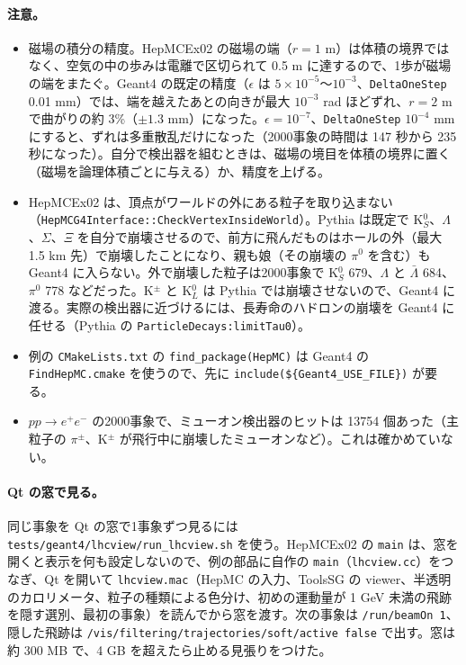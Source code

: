 \documentclass[a4paper,10pt]{ltjsarticle}
\begin{document}
\paragraph{注意。}
\begin{itemize}
\item 磁場の積分の精度。HepMCEx02 の磁場の端（$r=1$ m）は体積の境界ではなく、空気の中の歩みは電離で区切られて 0.5 m に達するので、1歩が磁場の端をまたぐ。Geant4 の既定の精度（$\epsilon$ は $5\times10^{-5}$〜$10^{-3}$、\texttt{DeltaOneStep} 0.01 mm）では、端を越えたあとの向きが最大 $10^{-3}$ rad ほどずれ、$r=2$ m で曲がりの約 3\%（$\pm1.3$ mm）になった。$\epsilon=10^{-7}$、\texttt{DeltaOneStep} $10^{-4}$ mm にすると、ずれは多重散乱だけになった（2000事象の時間は 147 秒から 235 秒になった）。自分で検出器を組むときは、磁場の境目を体積の境界に置く（磁場を論理体積ごとに与える）か、精度を上げる。
\item HepMCEx02 は、頂点がワールドの外にある粒子を取り込まない（\nolinkurl{HepMCG4Interface::CheckVertexInsideWorld}）。Pythia は既定で K$^0_S$、$\Lambda$、$\Sigma$、$\Xi$ を自分で崩壊させるので、前方に飛んだものはホールの外（最大 1.5 km 先）で崩壊したことになり、親も娘（その崩壊の $\pi^0$ を含む）も Geant4 に入らない。外で崩壊した粒子は2000事象で K$^0_S$ 679、$\Lambda$ と $\bar\Lambda$ 684、$\pi^0$ 778 などだった。K$^\pm$ と K$^0_L$ は Pythia では崩壊させないので、Geant4 に渡る。実際の検出器に近づけるには、長寿命のハドロンの崩壊を Geant4 に任せる（Pythia の \texttt{ParticleDecays:limitTau0}）。
\item 例の \texttt{CMakeLists.txt} の \texttt{find\_package(HepMC)} は Geant4 の \texttt{FindHepMC.cmake} を使うので、先に \texttt{include(\$\{Geant4\_USE\_FILE\})} が要る。
\item $pp\to e^+e^-$ の2000事象で、ミューオン検出器のヒットは 13754 個あった（主粒子の $\pi^\pm$、K$^\pm$ が飛行中に崩壊したミューオンなど）。これは確かめていない。
\end{itemize}

\paragraph{Qt の窓で見る。}同じ事象を Qt の窓で1事象ずつ見るには \nolinkurl{tests/geant4/lhcview/run_lhcview.sh} を使う。HepMCEx02 の \texttt{main} は、窓を開くと表示を何も設定しないので、例の部品に自作の \texttt{main}（\texttt{lhcview.cc}）をつなぎ、Qt を開いて \texttt{lhcview.mac}（HepMC の入力、ToolsSG の viewer、半透明のカロリメータ、粒子の種類による色分け、初めの運動量が 1 GeV 未満の飛跡を隠す選別、最初の事象）を読んでから窓を渡す。次の事象は \texttt{/run/beamOn 1}、隠した飛跡は \texttt{/vis/filtering/trajectories/soft/active false} で出す。窓は約 300 MB で、4 GB を超えたら止める見張りをつけた。
\end{document}
